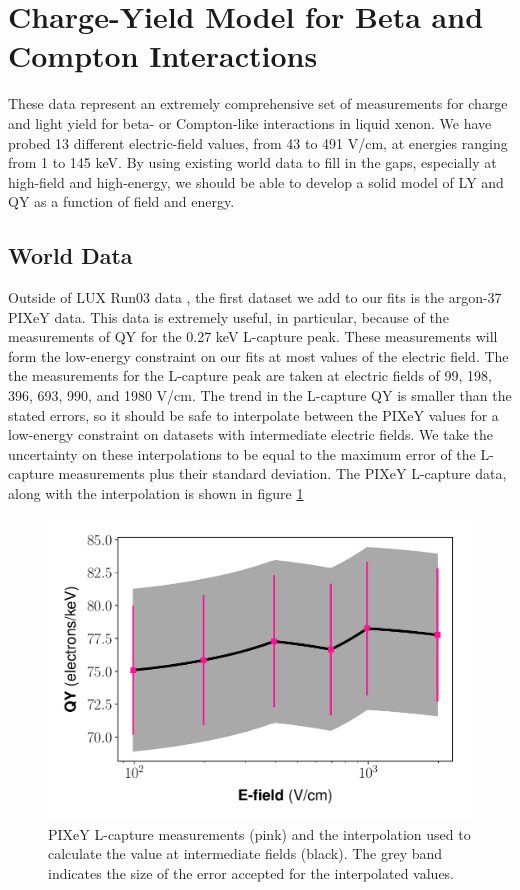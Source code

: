 \clearpage
\section{Charge-Yield Model for Beta and Compton Interactions}\label{sec:NESTbeta}
These data represent an extremely comprehensive set of measurements for charge and light yield for beta- or Compton-like interactions in liquid xenon. We have probed 13 different electric-field values, from 43 to 491 V/cm, at energies ranging from 1 to 145 keV. By using existing world data to fill in the gaps, especially at high-field and high-energy, we should be able to develop a solid model of LY and QY as a function of field and energy.

\subsection{World Data}
Outside of LUX Run03 data \cite{lux_tritium,Evanyields,DQyields}, the first dataset we add to our fits is the argon-37 PIXeY data\cite{pixey_ar37}. This data is extremely useful, in particular, because of the measurements of QY for the 0.27 keV L-capture peak. These measurements will form the low-energy constraint on our fits at most values of the electric field. The the measurements for the L-capture peak are taken at electric fields of 99, 198, 396, 693, 990, and 1980 V/cm. The trend in the L-capture QY is smaller than the stated errors, so it should be safe to interpolate between the PIXeY values for a low-energy constraint on datasets with intermediate electric fields. We take the uncertainty on these interpolations to be equal to the maximum error of the L-capture measurements plus their standard deviation. The PIXeY L-capture data, along with the interpolation is shown in figure \ref{fig:pixey_interp}
\begin{figure}[!h]
\centering
  \includegraphics[width=\textwidth]{Figures/Yields_fit_new/PIXeY_interp.pdf}
\caption{PIXeY L-capture measurements (pink) and the interpolation used to calculate the value at intermediate fields (black). The grey band indicates the size of the error accepted for the interpolated values.}
\label{fig:pixey_interp}
\end{figure}

